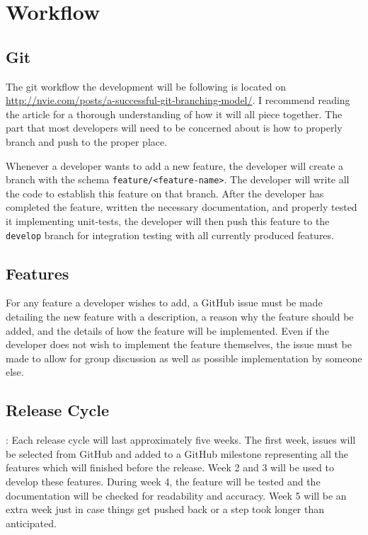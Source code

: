 \documentclass{article}
\begin{document}
\section{Workflow}
\subsection{Git}
The git workflow the development will be following is located on 
\url{http://nvie.com/posts/a-successful-git-branching-model/}. I recommend
reading the article for a thorough understanding of how it will all piece together.
The part that most developers will need to be concerned about is how to properly
branch and push to the proper place. 

Whenever a developer wants to add a new feature,
the developer will create a branch with the schema \texttt{feature/<feature-name>}. The 
developer will write all the code to establish this feature on that branch. After
the developer has completed the feature, written the necessary documentation, and
properly tested it implementing unit-tests, the developer will then push this
feature to the \texttt{develop} branch for integration testing with all currently
produced features. 

\subsection{Features}
For any feature a developer wishes to add, a GitHub issue must be made detailing
the new feature with a description, a reason why the feature should be added, and
the details of how the feature will be implemented. Even if the developer does
not wish to implement the feature themselves, the issue must be made to allow for
group discussion as well as possible implementation by someone else.

\subsection{Release Cycle}:
Each release cycle will last approximately five weeks. The first week, issues will
be selected from GitHub and added to a GitHub milestone representing all the 
features which will finished before the release. Week 2 and 3 will be used to 
develop these features. During week 4, the feature will be tested and the 
documentation will be checked for readability and accuracy. Week 5 will be an
extra week just in case things get pushed back or a step took longer than
anticipated.
\end{document}
